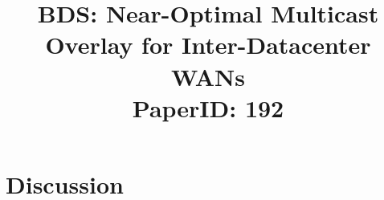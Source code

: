 \documentclass[letterpaper,twocolumn,10pt]{article}
\newcommand{\name}{BDS\xspace}
\begin{document}
{\title{\name: Near-Optimal Multicast Overlay for Inter-Datacenter WANs\\
\vspace{0.5cm}
\normalsize{PaperID: 192} \vspace{-1cm}}

\maketitle







%





%

%

%


%
%
%
%
%
%
%
%

%
%
%
%

\section{Discussion}

}
\end{document}
